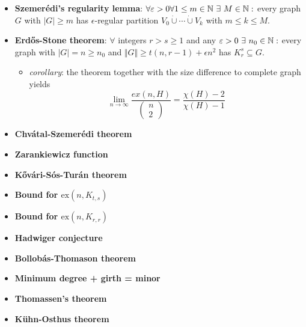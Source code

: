 \begin{itemize}
  \item \textbf{Szemerédi's regularity lemma}: $ \forall \epsilon > 0 \forall 1 \leq m \in \N \ \exists \ M \in \N : $ every graph $ G $ with $ \vert G \vert \geq m $ has $ \epsilon $-regular partition $ V_0 \dot{\cup} \cdots \dot{\cup} V_k $ with $ m \leq k \leq M $.
  \item \textbf{Erd\H{o}s-Stone theorem}: $ \forall $ integers $ r > s \geq 1 $ and any $ \varepsilon > 0 \ \exists \ n_0 \in \mathbb{N} : $ every graph with $ \vert G \vert = n \geq n_0 $ and $ \Vert G \Vert \geq t(n,r-1) + \epsilon n^2 $ has $ K_r^s \subseteq G $.
  \begin{itemize}
    \item \emph{corollary}: the theorem together with the size difference to complete graph yields
    \begin{equation*}
       \lim_{n \to \infty} \frac{ex(n,H)}{\left( \begin{smallmatrix}
         n \\ 2
       \end{smallmatrix} \right)} = \frac{\chi(H) - 2}{\chi(H) - 1}
     \end{equation*} 
  \end{itemize}
  \item \textbf{Chvátal-Szemerédi theorem}
  \item \textbf{Zarankiewicz function}
  \item \textbf{K\H{o}vári-Sós-Turán theorem}
  \item \textbf{Bound for $ \text{ex}(n,K_{t,s}) $}
  \item \textbf{Bound for $ \text{ex}(n,K_{r,r}) $}
  \item \textbf{Hadwiger conjecture}
  \item \textbf{Bollobás-Thomason theorem}
  \item \textbf{Minimum degree + girth = minor}
  \item \textbf{Thomassen's theorem}
  \item \textbf{Kühn-Osthus theorem}
\end{itemize}